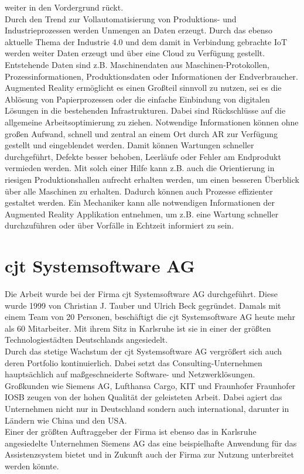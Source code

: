 weiter in den Vordergrund rückt. 
\\ 
\linebreak
Durch den Trend zur Vollautomatisierung von Produktions- und Industrieprozessen werden Unmengen an Daten erzeugt. Durch das ebenso 
aktuelle Thema der Industrie 4.0 und dem damit in Verbindung gebrachte \acs{IoT} werden weiter Daten erzeugt und über eine Cloud zu 
Verfügung gestellt. Entstehende Daten sind z.B. Maschinendaten aus Maschinen-Protokollen, Prozessinformationen, Produktionsdaten oder 
Informationen der Endverbraucher. \cite{industrie40.2019f} Augmented Reality ermöglicht es einen Großteil sinnvoll zu nutzen, sei es 
die Ablösung von Papierprozessen oder die einfache Einbindung von digitalen Lösungen in die bestehenden Infrastrukturen. \cite{industrie40ar.2019n} 
Dabei sind Rückschlüsse auf die allgemeine Arbeitsoptimierung zu ziehen. Notwendige Informationen können ohne 
großen Aufwand, schnell und zentral an einem Ort durch AR zur Verfügung gestellt und eingeblendet werden. Damit können 
Wartungen schneller durchgeführt, Defekte besser behoben, Leerläufe oder Fehler am Endprodukt vermieden werden. Mit solch einer Hilfe 
kann z.B. auch die Orientierung in riesigen Produktionshallen aufrecht erhalten werden, um einen besseren Überblick über alle Maschinen 
zu erhalten. Dadurch können auch Prozesse effizienter gestaltet werden. Ein Mechaniker kann alle notwendigen Informationen der Augmented 
Reality Applikation entnehmen, um z.B. eine Wartung schneller durchzuführen oder über Vorfälle in Echtzeit informiert zu sein. 



\section{cjt Systemsoftware AG}
\label{chap:cjt}
Die Arbeit wurde bei der Firma cjt Systemsoftware AG durchgeführt. Diese wurde
1999 von Christian J. Tauber und Ulrich Beck gegründet. Damals mit einem Team
von 20 Personen, beschäftigt die cjt Systemsoftware AG heute mehr als 60 Mitarbeiter. 
Mit ihrem Sitz in Karlsruhe ist sie in einer der größten Technologiestädten Deutschlands angesiedelt.
\\
\linebreak
Durch das stetige Wachstum der cjt Systemsoftware AG vergrößert sich auch deren
Portfolio kontinuierlich. Dabei setzt das Consulting-Unternehmen hauptsächlich auf maßgeschneiderte
Software- und Netzwerklösungen. Großkunden wie Siemens AG, Lufthansa Cargo,
\acs{KIT} und Fraunhofer \acs{Fraunhofer IOSB} zeugen von der hohen Qualität der geleisteten Arbeit. 
Dabei agiert das Unternehmen nicht nur in Deutschland sondern auch international, darunter in Ländern wie China und den USA.
\\ 
\linebreak
Einer der größten Auftraggeber der Firma ist ebenso das in Karlsruhe angesiedelte Unternehmen Siemens AG das eine beispielhafte 
Anwendung für das Assistenzsystem bietet und in Zukunft auch der Firma zur Nutzung unterbreitet werden könnte. 

